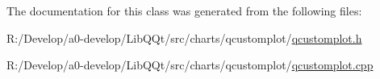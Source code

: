 The documentation for this class was generated from the following files\+:\begin{DoxyCompactItemize}
\item 
R\+:/\+Develop/a0-\/develop/\+Lib\+Q\+Qt/src/charts/qcustomplot/\mbox{\hyperlink{qcustomplot_8h}{qcustomplot.\+h}}\item 
R\+:/\+Develop/a0-\/develop/\+Lib\+Q\+Qt/src/charts/qcustomplot/\mbox{\hyperlink{qcustomplot_8cpp}{qcustomplot.\+cpp}}\end{DoxyCompactItemize}
